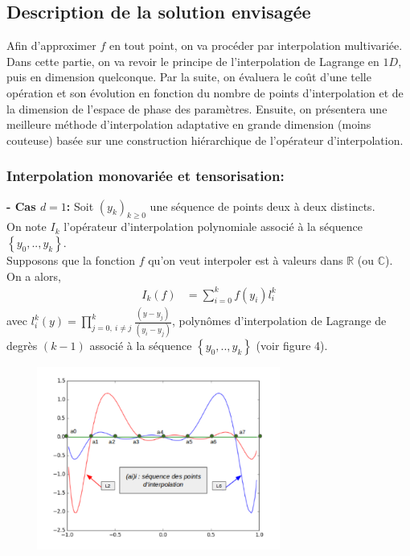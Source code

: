 \subsection{Description de la solution envisagée}\label{sec:4.1}
\hspace{0.5cm}
Afin d'approximer $f$ en tout point, on va procéder par interpolation multivariée. Dans cette partie, on va revoir le principe de
l'interpolation de Lagrange en $1D$, puis en dimension quelconque. Par la suite, on évaluera le coût d'une telle opération et son évolution en fonction
du nombre de points d'interpolation et de la dimension de l'espace de phase des paramètres.
Ensuite, on présentera une meilleure méthode d'interpolation adaptative en grande dimension (moins couteuse) basée sur une construction hiérarchique de l'opérateur d'interpolation. \\

\subsubsection{Interpolation monovariée et tensorisation:}\label{sec:4.1.1}
\hspace{0.5cm}
\textbf{ - Cas $d=1$: }
Soit $(y_k)_{k \geq 0}$ une séquence de points deux à deux distincts. \\
On note $I_k$ l'opérateur d'interpolation polynomiale associé à
la séquence $\left \{ y_0, .. , y_k \right \}$. \\
Supposons que la fonction $f$ qu'on veut interpoler est à valeurs dans $\mathbb{R}$ (ou $\mathbb{C}$).\\
\newpage
On a alors,
\begin{align}
   I_k(f) & = \sum_{i=0}^k f(y_i) l_i^k
\end{align}
avec $l_i^k(y) = \prod_{j=0,\ i \neq j}^k \frac{(y - y_j)}{(y_i - y_j)}$, polynômes d'interpolation de Lagrange
de degrès $(k-1)$ associé à la séquence $\left \{ y_0, .. , y_k \right \}$ (voir figure 4). \\
\begin{center}
\includegraphics[height=6cm,width=10cm]{images/lagrange_polynomials.png}
\end{center}

